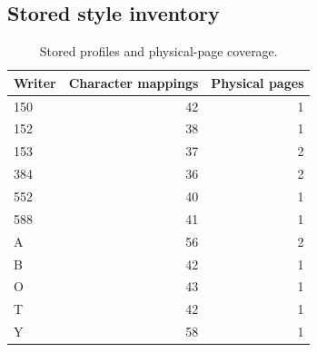 \subsection{Stored style inventory}\label{app:res-inventory}
\begin{table}[H]\centering\small
\begin{tabular}{lrr}
\toprule Writer & Character mappings & Physical pages\\\midrule
150 & 42 & 1\\
152 & 38 & 1\\
153 & 37 & 2\\
384 & 36 & 2\\
552 & 40 & 1\\
588 & 41 & 1\\
A & 56 & 2\\
B & 42 & 1\\
O & 43 & 1\\
T & 42 & 1\\
Y & 58 & 1\\
\bottomrule\end{tabular}
\caption{Stored profiles and physical-page coverage.}\label{tab:app-style-inventory}\end{table}
